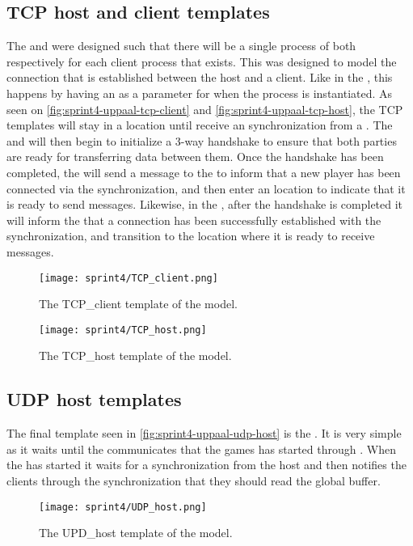 \subsection{TCP host and client templates}
The  and  were designed such that there will be a single process of both respectively for each client process that exists.
This was designed to model the connection that is established between the host and a client.
Like in the , this happens by having an  as a parameter for when the process is instantiated.
As seen on \autoref{fig:sprint4-uppaal-tcp-client} and \autoref{fig:sprint4-uppaal-tcp-host}, the TCP templates will stay in a  location until  receive an  synchronization from a .
The  and  will then begin to initialize a 3-way handshake to ensure that both parties are ready for transferring data between them.
Once the handshake has been completed, the  will send a message to the  to inform that a new player has been connected via the  synchronization, and then enter an  location to indicate that it is ready to send messages.
Likewise, in the , after the handshake is completed it will inform the  that a connection has been successfully established with the  synchronization, and transition to the  location where it is ready to receive messages.

\begin{figure}[h]
    \centering
    \texttt{[image: sprint4/TCP\_client.png]}
    \caption{The TCP\_client template of the \uppaal model.}
    \label{fig:sprint4-uppaal-tcp-client}
\end{figure}

\begin{figure}[h]
    \centering
    \texttt{[image: sprint4/TCP\_host.png]}
    \caption{The TCP\_host template of the \uppaal model.}
    \label{fig:sprint4-uppaal-tcp-host}
\end{figure}

\subsection{UDP host templates}
The final template seen in \autoref{fig:sprint4-uppaal-udp-host} is the .
It is very simple as it waits until the  communicates that the games has started through .
When the  has started it waits for a  synchronization from the host and then notifies the clients through the  synchronization that they should read the global buffer.
\begin{figure}[h]
    \centering
    \texttt{[image: sprint4/UDP\_host.png]}
    \caption{The UPD\_host template of the \uppaal model.}
    \label{fig:sprint4-uppaal-udp-host}
\end{figure}

